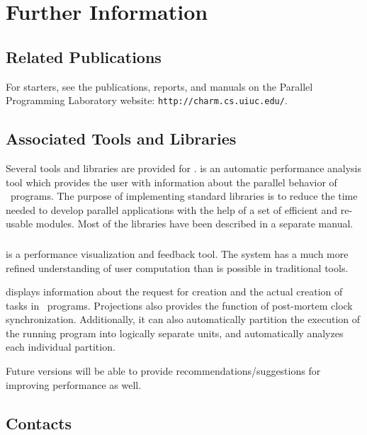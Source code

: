 \section{Further Information}

\subsection{Related Publications}
\label{publications}

For starters, see the publications, reports, and manuals 
on the Parallel Programming Laboratory website: \texttt{http://charm.cs.uiuc.edu/}. 

\subsection{Associated Tools and Libraries}

Several tools and libraries are provided for \charmpp{}. \projections{} 
is an automatic performance analysis tool which provides
the user with information about the parallel behavior of \charmpp\ programs. 
The purpose of implementing \charmpp{} standard
libraries is to reduce the time needed to develop parallel
applications with the help of a set of efficient and re-usable modules.
Most of the libraries have been described in a separate manual.

\subsubsection{\projections}

\projections{} is a performance visualization and feedback tool. The system has
a much more refined understanding of user computation than is possible in
traditional tools.

\projections{} displays information about the request for creation and the
actual creation of tasks in \charmpp\ programs. Projections also provides the
function of post-mortem clock synchronization. Additionally, it can also
automatically partition the execution of the running program into logically
separate units, and automatically analyzes each individual partition. 

Future versions will be able to provide recommendations/suggestions for
improving performance as well.

\subsection{Contacts}
\label{Distribution}

